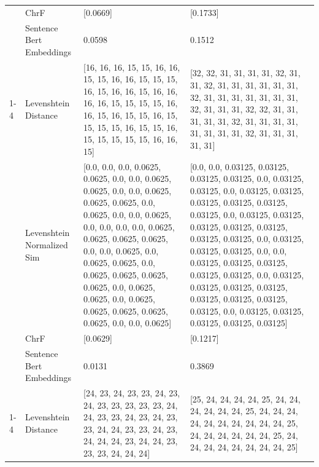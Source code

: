 \begin{tabular}{llll}
 & ChrF & [0.0669] & [0.1733] \\
 & Sentence Bert Embeddings & 0.0598 & 0.1512 \\
\cline{1-4}
\multirow[t]{4}{*}{Ikururio ti noru} & Levenshtein Distance & [16, 16, 16, 15, 15, 16, 16, 15, 15, 16, 16, 15, 15, 15, 16, 15, 16, 16, 15, 16, 16, 16, 16, 15, 15, 15, 15, 16, 16, 15, 16, 15, 15, 16, 15, 15, 15, 15, 16, 15, 15, 16, 15, 15, 15, 15, 15, 16, 16, 15] & [32, 32, 31, 31, 31, 31, 32, 31, 31, 32, 31, 31, 31, 31, 31, 31, 32, 31, 31, 31, 31, 31, 31, 31, 32, 31, 31, 31, 32, 32, 31, 31, 31, 31, 31, 32, 31, 31, 31, 31, 31, 31, 31, 31, 32, 31, 31, 31, 31, 31] \\
 & Levenshtein Normalized Sim & [0.0, 0.0, 0.0, 0.0625, 0.0625, 0.0, 0.0, 0.0625, 0.0625, 0.0, 0.0, 0.0625, 0.0625, 0.0625, 0.0, 0.0625, 0.0, 0.0, 0.0625, 0.0, 0.0, 0.0, 0.0, 0.0625, 0.0625, 0.0625, 0.0625, 0.0, 0.0, 0.0625, 0.0, 0.0625, 0.0625, 0.0, 0.0625, 0.0625, 0.0625, 0.0625, 0.0, 0.0625, 0.0625, 0.0, 0.0625, 0.0625, 0.0625, 0.0625, 0.0625, 0.0, 0.0, 0.0625] & [0.0, 0.0, 0.03125, 0.03125, 0.03125, 0.03125, 0.0, 0.03125, 0.03125, 0.0, 0.03125, 0.03125, 0.03125, 0.03125, 0.03125, 0.03125, 0.0, 0.03125, 0.03125, 0.03125, 0.03125, 0.03125, 0.03125, 0.03125, 0.0, 0.03125, 0.03125, 0.03125, 0.0, 0.0, 0.03125, 0.03125, 0.03125, 0.03125, 0.03125, 0.0, 0.03125, 0.03125, 0.03125, 0.03125, 0.03125, 0.03125, 0.03125, 0.03125, 0.0, 0.03125, 0.03125, 0.03125, 0.03125, 0.03125] \\
 & ChrF & [0.0629] & [0.1217] \\
 & Sentence Bert Embeddings & 0.0131 & 0.3869 \\
\cline{1-4}
\multirow[t]{4}{*}{Kuria muno ni kuoria nda} & Levenshtein Distance & [24, 23, 24, 23, 23, 24, 23, 24, 23, 23, 23, 23, 23, 24, 24, 23, 23, 24, 23, 24, 23, 23, 24, 24, 23, 23, 24, 23, 24, 24, 24, 23, 24, 24, 23, 23, 23, 24, 24, 24] & [25, 24, 24, 24, 24, 25, 24, 24, 24, 24, 24, 24, 25, 24, 24, 24, 24, 24, 24, 24, 24, 24, 24, 25, 24, 24, 24, 24, 24, 24, 25, 24, 24, 24, 24, 24, 24, 24, 24, 25] \\

\end{tabular}
